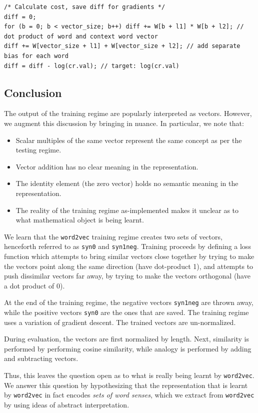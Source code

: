 \documentclass[11pt]{book}
\begin{document}
\begin{verbatim}
/* Calculate cost, save diff for gradients */
diff = 0;
for (b = 0; b < vector_size; b++) diff += W[b + l1] * W[b + l2]; // dot product of word and context word vector
diff += W[vector_size + l1] + W[vector_size + l2]; // add separate bias for each word
diff = diff - log(cr.val); // target: log(cr.val)
\end{verbatim}

\subsection{Conclusion}

The output of the training regime are popularly interpreted as vectors.
However, we augment this discussion by bringing in nuance. In particular, we
note that:
\begin{itemize}
\item Scalar multiples of the same vector represent the same concept as per the testing regime.
\item Vector addition has no clear meaning in the representation.
\item The identity element (the zero vector) holds no semantic meaning in the representation.
\item The reality of the training regime as-implemented makes it unclear as to
      what mathematical object is being learnt.
\end{itemize}

We learn that the \texttt{word2vec} training regime creates two sets of
vectors, henceforth referred to as \texttt{syn0} and \texttt{syn1neg}. Training proceeds
by defining a loss function which attempts to bring similar vectors close together by trying
to make the vectors point along the same direction (have dot-product 1),
and attempts to push dissimilar vectors far away, by trying to make the vectors
orthogonal (have a dot product of $0$).

At the end of the training regime, the negative vectors \texttt{syn1neg} are
thrown away, while the positive vectors
\texttt{syn0} are the ones that are saved. The training regime uses a
variation of gradient descent. The trained vectors are un-normalized.

During evaluation, the vectors are first normalized by length. Next,
similarity is performed by performing cosine similarity, while analogy
is performed by adding and subtracting vectors.

Thus, this leaves the question open as to what is really being learnt by
\texttt{word2vec}. We answer this question by hypothesizing that the
representation that is learnt by \texttt{word2vec} in fact encodes \emph{sets
of word senses}, which we extract from \texttt{word2vec} by using ideas of
abstract interpretation.
\end{document}
